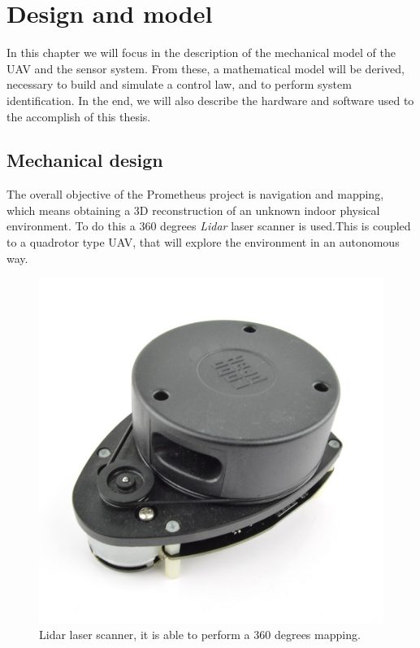 \chapter{Design and model}
\label{designModel}

In this chapter we will focus in the description of the mechanical model of the UAV and the sensor system. From these, a mathematical model will be derived, necessary to build and simulate a control law, and to perform system identification. In the end, we will also describe the hardware and software used to the accomplish of this thesis.

\section{Mechanical design}
\label{mechanicalDesign}

The overall objective of the Prometheus project is navigation and mapping, which means obtaining a 3D reconstruction of an unknown indoor physical environment. To do this a 360 degrees \textit{Lidar} laser scanner is used.This is coupled to a quadrotor type UAV, that will explore the environment in an autonomous way.

\begin{figure}
	\includegraphics[scale=0.21]{images/lidar_laser.jpg}
	\caption{Lidar laser scanner, it is able to perform a 360 degrees mapping.}
	\label{fig:lidar}
\end{figure}

